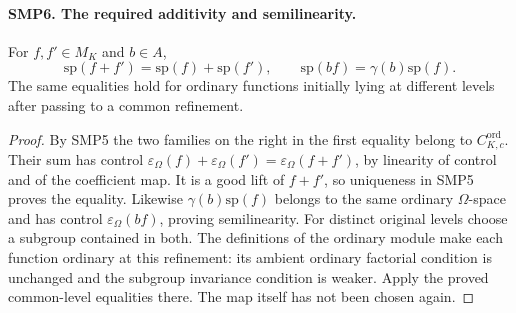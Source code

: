 \documentclass[11pt,a4paper]{article}
\numberwithin{equation}{section}
\theoremstyle{remark}\newtheorem{remark}[theorem]{Remark}
\begin{document}
\paragraph{SMP6. The required additivity and semilinearity.}
\label{claim:SMP6}
For $f,\allowbreak{} f'\in M_K$ and $b\in A$,
\[
 \mathrm{sp}(f+f')=\mathrm{sp}(f)+\mathrm{sp}(f'),
 \qquad
 \mathrm{sp}(bf)=\gamma(b)\mathrm{sp}(f).
\]
The same equalities hold for ordinary functions initially
lying at different levels after passing to a common
refinement.
\begin{proof}
By SMP5 the two families on the right in the first
equality belong to $C^{\mathrm{ord}}_{K,\allowbreak{} c}$.
Their sum has control
$\varepsilon_\Omega(f)+\varepsilon_\Omega(f')
=\varepsilon_\Omega(f+f')$, by linearity of control
and of the coefficient map.  It is a good lift of
$f+f'$, so uniqueness in SMP5 proves the equality.
Likewise $\gamma(b)\mathrm{sp}(f)$ belongs to the same
ordinary $\Omega$-space and has control
$\varepsilon_\Omega(bf)$, proving semilinearity.
For distinct original levels choose a subgroup contained
in both.  The definitions of the ordinary module make
each function ordinary at this refinement: its ambient
ordinary factorial condition is unchanged and the
subgroup invariance condition is weaker.  Apply the
proved common-level equalities there.  The map itself
has not been chosen again.
\end{proof}

\end{document}
